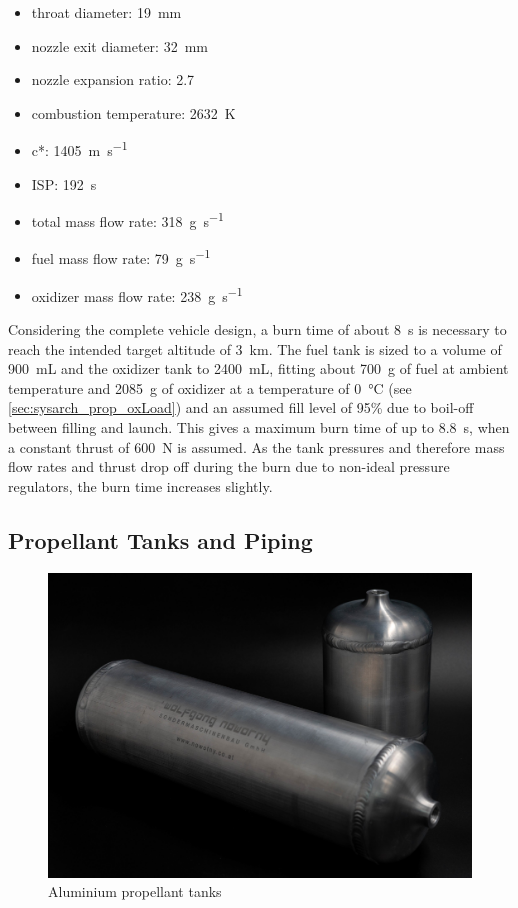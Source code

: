 \begin{itemize}
\item throat diameter: \SI{19}{\milli\meter}
\item nozzle exit diameter: \SI{32}{\milli\meter}
\item nozzle expansion ratio: 2.7
\item combustion temperature: \SI{2632}{\kelvin}
\item c*: \SI{1405}{\meter\per\second}
\item ISP: \SI{192}{\second}
\item total mass flow rate: \SI{318}{\gram\per\second}
\item fuel mass flow rate: \SI{79}{\gram\per\second}
\item oxidizer mass flow rate: \SI{238}{\gram\per\second}
\end{itemize}

Considering the complete vehicle design, a burn time of about \SI{8}{\second} is necessary to reach the intended target altitude of \SI{3}{\kilo\meter}. The fuel tank is sized to a volume of \SI{900}{\milli\liter} and the oxidizer tank to \SI{2400}{\milli\liter}, fitting about \SI{700}{\gram} of fuel at ambient temperature and \SI{2085}{\gram} of oxidizer at a temperature of \SI{0}{\celsius} (see \cref{sec:sysarch_prop_oxLoad}) and an assumed fill level of 95\% due to boil-off between filling and launch. This gives a maximum burn time of up to \SI{8.8}{\second}, when a constant thrust of \SI{600}{\newton} is assumed. As the tank pressures and therefore mass flow rates and thrust drop off during the burn due to non-ideal pressure regulators, the burn time increases slightly.

\subsection{Propellant Tanks and Piping}

\begin{figure}[H]
\centering
\includegraphics[width=\textwidth]{Propulsion/propTanks.jpg}
\caption{Aluminium propellant tanks}
\label{fig:sysarch_prop_propTanks}
\end{figure}


